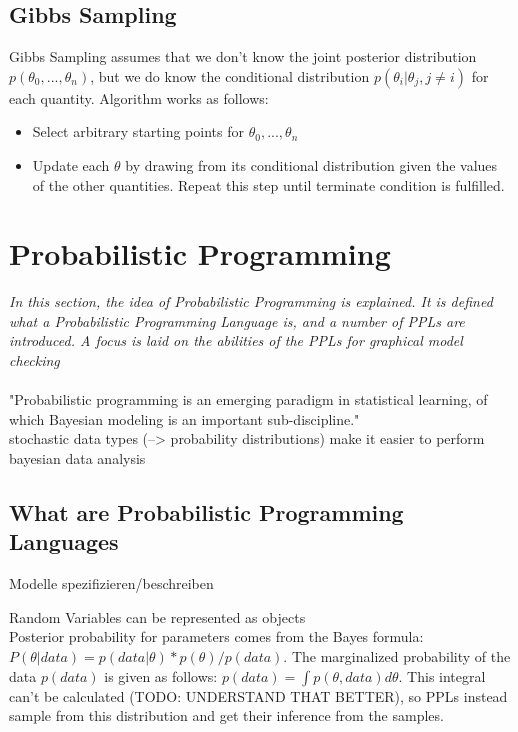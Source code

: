 \documentclass{article}
\begin{document}
\subsection{Gibbs Sampling}

Gibbs Sampling assumes that we don't know the joint posterior distribution $p(\theta_0,...,\theta_n)$, but we do know the conditional distribution $p(\theta_i | \theta_j, j \neq i)$ for each quantity.
Algorithm works as follows:
\begin{itemize}
\item Select arbitrary starting points for $\theta_0,...,\theta_n$
\item Update each $\theta$ by drawing from its conditional distribution given the values of the other quantities. Repeat this step until terminate condition is fulfilled.
\end{itemize}
\cite{Martz1994}

\section{Probabilistic Programming}

\textit{In this section,  the idea of Probabilistic Programming is explained. It is defined what a Probabilistic Programming Language is, and a number of PPLs are introduced. A focus is laid on the abilities of the PPLs for graphical model checking}
\\
\\
"Probabilistic programming is an emerging paradigm in statistical learning, of which Bayesian modeling is an important sub-discipline." \cite{Salvatier2016}
\\
stochastic data types (--> probability distributions) make it easier to perform bayesian data analysis

\subsection{What are Probabilistic Programming Languages}

Modelle spezifizieren/beschreiben 

Random Variables can be represented as objects
\\
Posterior probability for parameters comes from the Bayes formula: $P(\theta|data) = p(data|\theta) * p(\theta) / p(data)$. The marginalized probability of the data $p(data)$ is given as follows:
$p(data) = \int p(\theta,data) d \theta$. This integral can't be calculated (TODO: UNDERSTAND THAT BETTER), so PPLs instead sample from this distribution and get their inference from the samples.
\end{document}
